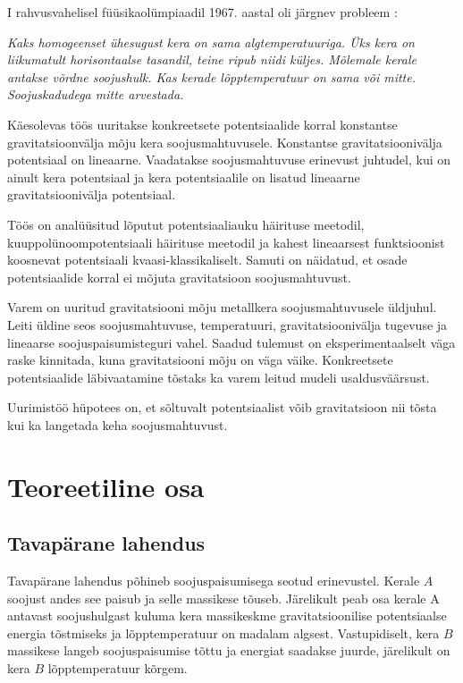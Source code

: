 \documentclass{trkut}%
\begin{document}
\maketitle%
\tableofcontents%
\nummerdame%
I rahvusvahelisel füüsikaolümpiaadil 1967. aastal oli järgnev probleem \cite{ipho67}:

\textit{Kaks homogeenset ühesugust kera on sama algtemperatuuriga. Üks kera on liikumatult horisontaalse tasandil, teine ripub niidi küljes. Mõlemale kerale antakse võrdne soojushulk. Kas kerade lõpptemperatuur on sama või mitte. Soojuskadudega mitte arvestada.}

Käesolevas töös uuritakse konkreetsete potentsiaalide korral konstantse gravitatsioonvälja mõju kera soojusmahtuvusele. Konstantse gravitatsioonivälja potentsiaal on lineaarne. Vaadatakse soojusmahtuvuse erinevust juhtudel, kui on ainult kera potentsiaal ja kera potentsiaalile on lisatud lineaarne gravitatsioonivälja potentsiaal. 

Töös on analüüsitud lõputut potentsiaaliauku häirituse meetodil, kuuppolünoompotentsiaali häirituse meetodil ja kahest lineaarsest funktsioonist koosnevat potentsiaali kvaasi-klassikaliselt. Samuti on näidatud, et osade potentsiaalide korral ei mõjuta gravitatsioon soojusmahtuvust.

Varem on uuritud gravitatsiooni mõju metallkera soojusmahtuvusele üldjuhul. Leiti üldine seos soojusmahtuvuse, temperatuuri, gravitatsioonivälja tugevuse ja lineaarse soojuspaisumisteguri vahel. Saadud tulemust on eksperimentaalselt väga raske kinnitada, kuna gravitatsiooni mõju on väga väike. Konkreetsete potentsiaalide läbivaatamine tõstaks ka varem leitud mudeli usaldusväärsust.

Uurimistöö hüpotees on, et sõltuvalt potentsiaalist võib gravitatsioon nii tõsta kui ka langetada keha soojusmahtuvust.

\chapter{Teoreetiline osa}

\section{Tavapärane lahendus}

Tavapärane lahendus põhineb soojuspaisumisega seotud erinevustel. Kerale $A$ soojust andes see paisub ja selle massikese tõuseb. Järelikult peab osa kerale A antavast soojushulgast kuluma kera massikeskme gravitatsioonilise potentsiaalse energia tõstmiseks ja lõpptemperatuur on madalam algsest. Vastupidiselt, kera $B$ massikese langeb soojuspaisumise tõttu ja energiat saadakse juurde, järelikult on kera $B$ lõpptemperatuur kõrgem. 
\end{document}
